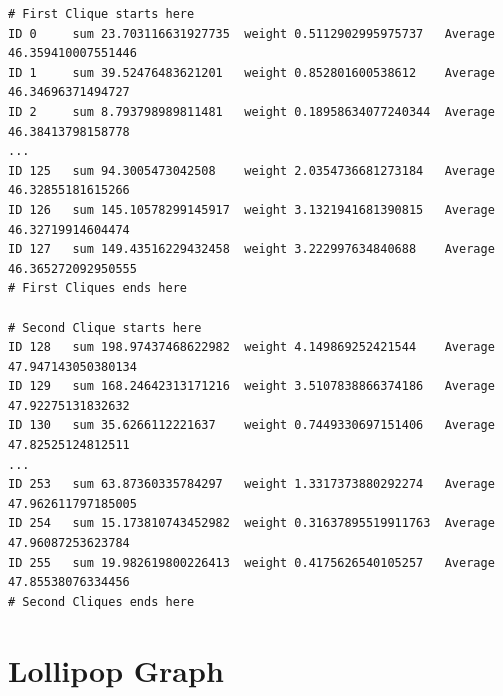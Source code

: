 \begin{lstlisting}[caption=Snippet of Simulation Outcomes ATPPS: exp2, captionpos=b, label=lst:exampleROCOutcomes]
# First Clique starts here
ID 0	 sum 23.703116631927735	 weight 0.5112902995975737	 Average 46.359410007551446
ID 1	 sum 39.52476483621201	 weight 0.852801600538612	 Average 46.34696371494727
ID 2	 sum 8.793798989811481	 weight 0.18958634077240344	 Average 46.38413798158778
...
ID 125	 sum 94.3005473042508	 weight 2.0354736681273184	 Average 46.32855181615266
ID 126	 sum 145.10578299145917	 weight 3.1321941681390815	 Average 46.32719914604474
ID 127	 sum 149.43516229432458	 weight 3.222997634840688	 Average 46.365272092950555
# First Cliques ends here

# Second Clique starts here
ID 128	 sum 198.97437468622982	 weight 4.149869252421544	 Average 47.947143050380134
ID 129	 sum 168.24642313171216	 weight 3.5107838866374186	 Average 47.92275131832632
ID 130	 sum 35.6266112221637	 weight 0.7449330697151406	 Average 47.82525124812511
...
ID 253	 sum 63.87360335784297	 weight 1.3317373880292274	 Average 47.962611797185005
ID 254	 sum 15.173810743452982	 weight 0.31637895519911763	 Average 47.96087253623784
ID 255	 sum 19.982619800226413	 weight 0.4175626540105257	 Average 47.85538076334456
# Second Cliques ends here
\end{lstlisting}

\section{Lollipop Graph}\label{sec:lollipopgraph}

